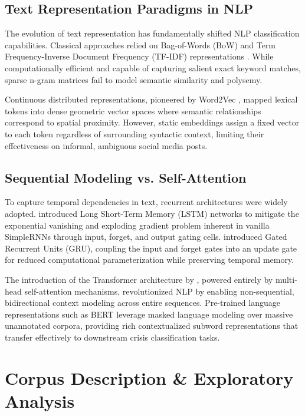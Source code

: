 \documentclass[11pt,a4paper]{article}
\begin{document}
\subsection{Text Representation Paradigms in NLP}
The evolution of text representation has fundamentally shifted NLP classification capabilities. Classical approaches relied on Bag-of-Words (BoW) and Term Frequency-Inverse Document Frequency (TF-IDF) representations \cite{pedregosa2011scikit}. While computationally efficient and capable of capturing salient exact keyword matches, sparse n-gram matrices fail to model semantic similarity and polysemy.

Continuous distributed representations, pioneered by Word2Vec \cite{mikolov2013distributed}, mapped lexical tokens into dense geometric vector spaces where semantic relationships correspond to spatial proximity. However, static embeddings assign a fixed vector to each token regardless of surrounding syntactic context, limiting their effectiveness on informal, ambiguous social media posts.

\subsection{Sequential Modeling vs. Self-Attention}
To capture temporal dependencies in text, recurrent architectures were widely adopted. \citet{hochreiter1997lstm} introduced Long Short-Term Memory (LSTM) networks to mitigate the exponential vanishing and exploding gradient problem inherent in vanilla SimpleRNNs through input, forget, and output gating cells. \citet{cho2014gru} introduced Gated Recurrent Units (GRU), coupling the input and forget gates into an update gate for reduced computational parameterization while preserving temporal memory.

The introduction of the Transformer architecture by \citet{vaswani2017attention}, powered entirely by multi-head self-attention mechanisms, revolutionized NLP by enabling non-sequential, bidirectional context modeling across entire sequences. Pre-trained language representations such as BERT \cite{devlin2019bert} leverage masked language modeling over massive unannotated corpora, providing rich contextualized subword representations that transfer effectively to downstream crisis classification tasks.

\section{Corpus Description \& Exploratory Analysis}
\label{sec:dataset}
\end{document}
